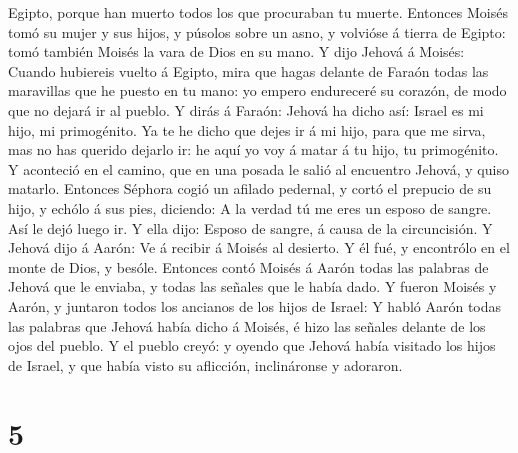 Egipto, porque han muerto todos los que procuraban tu muerte.
 Entonces Moisés tomó su mujer y sus hijos, y púsolos
sobre un asno, y volvióse á tierra de Egipto: tomó también Moisés la
vara de Dios en su mano.  Y dijo Jehová á Moisés: Cuando
hubiereis vuelto á Egipto, mira que hagas delante de Faraón todas las
maravillas que he puesto en tu mano: yo empero endureceré su corazón, de
modo que no dejará ir al pueblo.  Y dirás á Faraón:
Jehová ha dicho así: Israel es mi hijo, mi primogénito. 
Ya te he dicho que dejes ir á mi hijo, para que me sirva, mas no has
querido dejarlo ir: he aquí yo voy á matar á tu hijo, tu primogénito.
 Y aconteció en el camino, que en una posada le salió al
encuentro Jehová, y quiso matarlo.  Entonces Séphora
cogió un afilado pedernal, y cortó el prepucio de su hijo, y echólo á
sus pies, diciendo: A la verdad tú me eres un esposo de sangre.
 Así le dejó luego ir. Y ella dijo: Esposo de sangre, á
causa de la circuncisión.  Y Jehová dijo á Aarón: Ve á
recibir á Moisés al desierto. Y él fué, y encontrólo en el monte de
Dios, y besóle.  Entonces contó Moisés á Aarón todas las
palabras de Jehová que le enviaba, y todas las señales que le había
dado.  Y fueron Moisés y Aarón, y juntaron todos los
ancianos de los hijos de Israel:  Y habló Aarón todas las
palabras que Jehová había dicho á Moisés, é hizo las señales delante de
los ojos del pueblo.  Y el pueblo creyó: y oyendo que
Jehová había visitado los hijos de Israel, y que había visto su
aflicción, inclináronse y adoraron.

\hypertarget{section-4}{%
\section{5}\label{section-4}}


